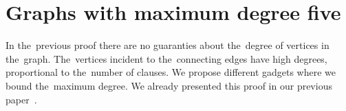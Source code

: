 \section{Graphs with maximum degree five}

In the~previous proof there are no guaranties about
the~degree of vertices in the~graph. The~vertices incident to the~connecting edges
have high degrees, proportional to the~number of clauses.
We propose different gadgets where we bound the~maximum degree.
We already presented this proof in our previous paper~\cite{my_paper}.

%
%

